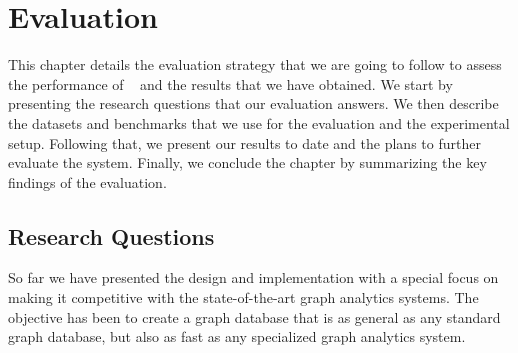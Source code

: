 \chapter{Evaluation}
\label{chapter:evaluation}

This chapter details the evaluation strategy that we are going to follow to assess the performance of ~\project{} and the results that we have obtained.
We start by presenting the research questions that our evaluation answers. 
We then describe the datasets and benchmarks that we use for the evaluation and the experimental setup.
Following that, we present our results to date and the plans to further evaluate the system.
Finally, we conclude the chapter by summarizing the key findings of the evaluation.

\section{Research Questions}
\label{eval:structural_research_questions}

So far we have presented the design and implementation with a special focus on making it competitive with the state-of-the-art graph analytics systems.
The objective has been to create a graph database that is as general as any standard graph database, but also as fast as any specialized graph analytics system.


